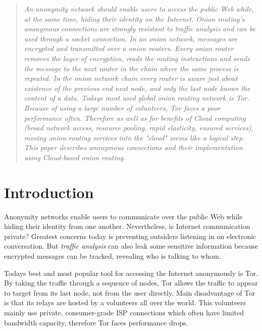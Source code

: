\documentclass{acm_proc_article-sp}
\begin{document}
\maketitle
\begin{abstract}
\textit{An anonymity network should enable users to access the public Web while, at the same time, hiding their identity on the Internet. 
Onion routing's anonymous connections are strongly resistant to traffic analysis and can be used through a socket connection. 
In an onion network, messages are encrypted and transmitted over a onion routers. Every onion router removes the layer of encryption, 
reads the routing instructions and sends the message to the next router in the chain where the same process is repeated. In the onion network chain
every router is aware just about existence of the previous end next node, and only the last node knows the content of a data.
Todays most used global onion routing network is Tor. Because of using a large number of volunteers, Tor faces a poor performance often.
Therefore as well as for benefits of Cloud computing (broad network access, resource pooling, rapid elasticity, ensured services), 
moving onion routing services into the "cloud" seems like a logical step.
This paper describes anonymous connections and their implementation using Cloud-based onion routing.
}
\end{abstract}




\section{Introduction}
Anonymity networks enable users to communicate over the public Web while hiding their identity from one another.
Nevertheless, is Internet communication private? Greatest concerns today is preventing outsiders listening in on electronic
conversation. But \textit{traffic analysis} can also leak some sensitive information because encrypted messages can be tracked, revealing 
who is talking to whom. \cite{cite1}

Todays best and most popular tool for accessing the Internet anonymously is Tor. By taking the traffic through a sequence of nodes, 
Tor allows the traffic to appear to target from its last node, not from the user directly. Main disadvantage of Tor is that its relays are hosted 
by a volunteers all over the world. This volunteers mainly use private, consumer-grade ISP connections which often have limited bandwidth 
capacity, therefore Tor faces performance drops. \cite{cite2}
\end{document}
